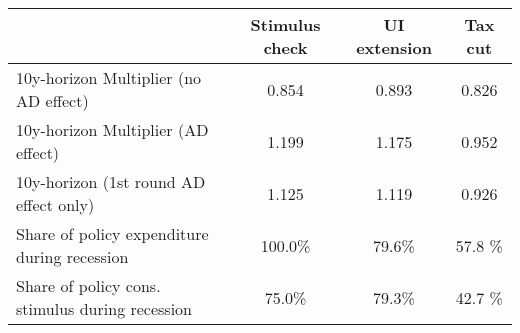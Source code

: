 \begin{tabular}{@{}lccc@{}} 
\toprule 
& Stimulus check    & UI extension    & Tax cut     \\  \midrule 
10y-horizon Multiplier (no AD effect) &0.854  & 0.893  & 0.826     \\ 
10y-horizon Multiplier (AD effect) &1.199  & 1.175  & 0.952     \\ 
10y-horizon (1st round AD effect only) &1.125  & 1.119  & 0.926     \\ 
Share of policy expenditure during recession &100.0\%  & 79.6\%  & 57.8 \%    \\ 
Share of policy cons. stimulus during recession &75.0\%  & 79.3\%  & 42.7 \%    \\ 
\end{tabular}  
